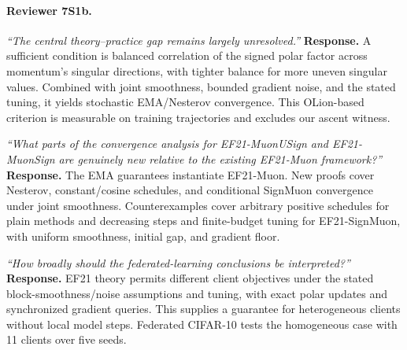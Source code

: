 \paragraph{Reviewer 7S1b.}
\noindent\emph{``The central theory--practice gap remains largely unresolved.''}
\textbf{Response.} A sufficient condition is balanced correlation of the signed polar factor across momentum's singular directions, with tighter balance for more uneven singular values. Combined with joint smoothness, bounded gradient noise, and the stated tuning, it yields stochastic EMA/Nesterov convergence. This OLion-based criterion is measurable on training trajectories and excludes our ascent witness.

\noindent\emph{``What parts of the convergence analysis for EF21-MuonUSign and EF21-MuonSign are genuinely new relative to the existing EF21-Muon framework?''}
\textbf{Response.} The EMA guarantees instantiate EF21-Muon. New proofs cover Nesterov, constant/cosine schedules, and conditional SignMuon convergence under joint smoothness. Counterexamples cover arbitrary positive schedules for plain methods and decreasing steps and finite-budget tuning for EF21-SignMuon, with uniform smoothness, initial gap, and gradient floor.

\noindent\emph{``How broadly should the federated-learning conclusions be interpreted?''}
\textbf{Response.} EF21 theory permits different client objectives under the stated block-smoothness/noise assumptions and tuning, with exact polar updates and synchronized gradient queries. This supplies a guarantee for heterogeneous clients without local model steps. Federated CIFAR-10 tests the homogeneous case with 11 clients over five seeds.
